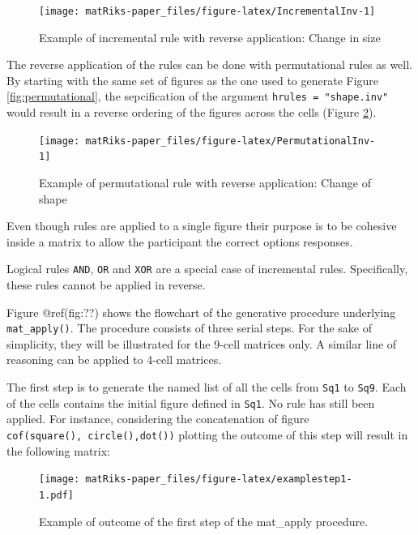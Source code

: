 \begin{figure}

{\centering \texttt{[image: matRiks-paper\_files/figure-latex/IncrementalInv-1]} 

}

\caption{Example of incremental rule with reverse application: Change in size}\label{fig:IncrementalInv}
\end{figure}

The reverse application of the rules can be done with permutational rules as well. By starting with the same set of figures as the one used to generate Figure \ref{fig:permutational}, the sepcification of the argument \texttt{hrules\ =\ "shape.inv"} would result in a reverse ordering of the figures across the cells (Figure \ref{fig:PermutationalInv}).

\begin{figure}

{\centering \texttt{[image: matRiks-paper\_files/figure-latex/PermutationalInv-1]} 

}

\caption{Example of  permutational rule with reverse application: Change of shape}\label{fig:PermutationalInv}
\end{figure}

Even though rules are applied to a single figure their purpose is to be cohesive inside a matrix to allow the participant the correct options responses.

Logical rules \texttt{AND}, \texttt{OR} and \texttt{XOR} are a special case of incremental rules.
Specifically, these rules cannot be applied in reverse.

Figure @ref(fig:??) shows the flowchart of the generative procedure underlying \texttt{mat\_apply()}.
The procedure consists of three serial steps.
For the sake of simplicity, they will be illustrated for the 9-cell matrices only. A similar line of reasoning can be applied to 4-cell matrices.

The first step is to generate the named list of all the cells from \texttt{Sq1} to \texttt{Sq9}.
Each of the cells contains the initial figure defined in \texttt{Sq1}. No rule has still been applied.
For instance, considering the concatenation of figure \texttt{cof(square(),\ circle(),dot())} plotting the outcome of this step will result in the following matrix:

\begin{figure}
\centering
\texttt{[image: matRiks-paper\_files/figure-latex/examplestep1-1.pdf]}
\caption{\label{fig:examplestep1}Example of outcome of the first step of the mat\_apply procedure.}
\end{figure}

